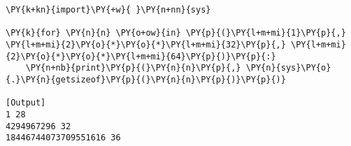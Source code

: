 \begin{Verbatim}[label=\makebox{\href{https://github.com/unipi-physics-labs/lab1-notes/tree/main/snippy/integer_size.py}{https://github.com/.../integer\_size.py}},commandchars=\\\{\}]
\PY{k+kn}{import}\PY{+w}{ }\PY{n+nn}{sys}

\PY{k}{for} \PY{n}{n} \PY{o+ow}{in} \PY{p}{(}\PY{l+m+mi}{1}\PY{p}{,} \PY{l+m+mi}{2}\PY{o}{*}\PY{o}{*}\PY{l+m+mi}{32}\PY{p}{,} \PY{l+m+mi}{2}\PY{o}{*}\PY{o}{*}\PY{l+m+mi}{64}\PY{p}{)}\PY{p}{:}
    \PY{n+nb}{print}\PY{p}{(}\PY{n}{n}\PY{p}{,} \PY{n}{sys}\PY{o}{.}\PY{n}{getsizeof}\PY{p}{(}\PY{n}{n}\PY{p}{)}\PY{p}{)}

[Output]
1 28
4294967296 32
18446744073709551616 36
\end{Verbatim}
